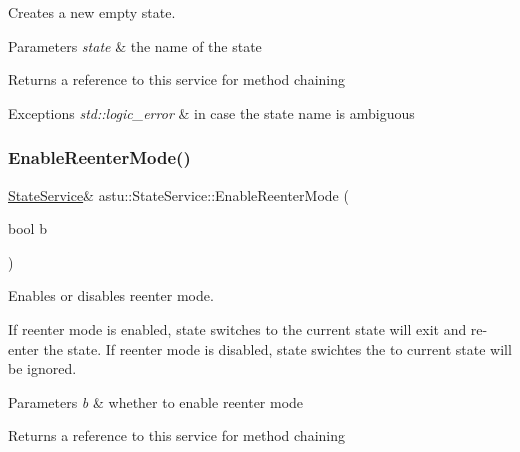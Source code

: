 Creates a new empty state.


\begin{DoxyParams}{Parameters}
{\em state} & the name of the state \\
\hline
\end{DoxyParams}
\begin{DoxyReturn}{Returns}
a reference to this service for method chaining 
\end{DoxyReturn}

\begin{DoxyExceptions}{Exceptions}
{\em std\+::logic\+\_\+error} & in case the state name is ambiguous \\
\hline
\end{DoxyExceptions}
\mbox{\label{classastu_1_1StateService_aab296d0077f23deef7e0bd383516019a}} 
\subsubsection{\texorpdfstring{Enable\+Reenter\+Mode()}{EnableReenterMode()}}
{\footnotesize\ttfamily \hyperlink{classastu_1_1StateService}{State\+Service}\& astu\+::\+State\+Service\+::\+Enable\+Reenter\+Mode (\begin{DoxyParamCaption}\item[{bool}]{b }\end{DoxyParamCaption})}

Enables or disables reenter mode.

If reenter mode is enabled, state switches to the current state will exit and re-\/enter the state. If reenter mode is disabled, state swichtes the to current state will be ignored.


\begin{DoxyParams}{Parameters}
{\em b} & whether to enable reenter mode \\
\hline
\end{DoxyParams}
\begin{DoxyReturn}{Returns}
a reference to this service for method chaining 
\end{DoxyReturn}
\mbox{\label{classastu_1_1StateService_ac643aebb1bfe9880db1bac7533e0ec75}} 
